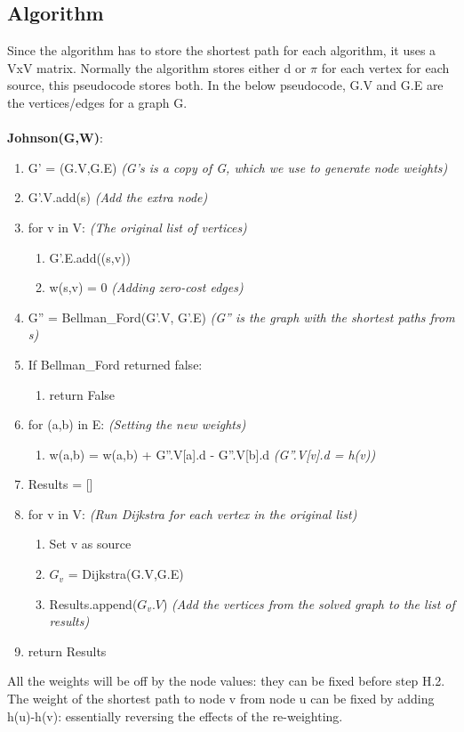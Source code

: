 \subsection{Algorithm}
Since the algorithm has to store the shortest path for each algorithm, it uses a VxV matrix. Normally the algorithm stores either d or $\pi$ for each vertex for each source, this pseudocode stores both. In the below pseudocode, G.V and G.E are the vertices/edges for a graph G.\\ \\
\textbf{Johnson(G,W)}:
\begin{enumerate}[label=\Alph*]
    \item G' = (G.V,G.E) \emph{(G's is a copy of G, which we use to generate node weights)}
    \item G'.V.add(s) \emph{(Add the extra node)}
    \item  for v in V: \emph{(The original list of vertices)}
\begin{enumerate}[label=\arabic*]
        \item G'.E.add((s,v))
        \item w(s,v) = 0  \emph{(Adding zero-cost edges)}
\end{enumerate}        
    \item G'' = Bellman\_Ford(G'.V, G'.E) \emph{(G'' is the graph with the shortest paths from s)}
    \item If Bellman\_Ford returned false:
    \begin{enumerate}
        \item [] return False
    \end{enumerate}    
    \item  for (a,b) in E: \emph{(Setting the new weights)}
    \begin{enumerate}
        \item [] w(a,b) = w(a,b) + G''.V[a].d -  G''.V[b].d  \quad \emph{(G''.V[v].d = h(v))}
    \end{enumerate}
    \item Results = []
    \item for v in V: \emph{(Run Dijkstra for each vertex in the original list)}
\begin{enumerate}[label=\arabic*]
    \item Set v as source
    \item $G_v$ = Dijkstra(G.V,G.E) 
    \item Results.append($G_v.V$) \emph{(Add the vertices from the solved graph to the list of results)}
\end{enumerate}    
    \item return Results
\end{enumerate}
All the weights will be off by the node values: they can be fixed before step H.2. The weight of the shortest path to node v from node u can be fixed by adding h(u)-h(v): essentially reversing the effects of the re-weighting. 